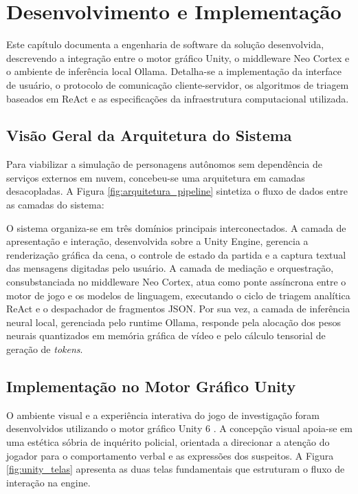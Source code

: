 \chapter{Desenvolvimento e Implementação}
\label{cap:implementacao}

Este capítulo documenta a engenharia de software da solução desenvolvida, descrevendo a integração entre o motor gráfico Unity, o middleware Neo Cortex e o ambiente de inferência local Ollama. Detalha-se a implementação da interface de usuário, o protocolo de comunicação cliente-servidor, os algoritmos de triagem baseados em ReAct e as especificações da infraestrutura computacional utilizada.

\section{Visão Geral da Arquitetura do Sistema}
\label{sec:dev_arquitetura}

Para viabilizar a simulação de personagens autônomos sem dependência de serviços externos em nuvem, concebeu-se uma arquitetura em camadas desacopladas. A Figura \ref{fig:arquitetura_pipeline} sintetiza o fluxo de dados entre as camadas do sistema:



O sistema organiza-se em três domínios principais interconectados. A camada de apresentação e interação, desenvolvida sobre a Unity Engine, gerencia a renderização gráfica da cena, o controle de estado da partida e a captura textual das mensagens digitadas pelo usuário. A camada de mediação e orquestração, consubstanciada no middleware Neo Cortex, atua como ponte assíncrona entre o motor de jogo e os modelos de linguagem, executando o ciclo de triagem analítica ReAct e o despachador de fragmentos JSON. Por sua vez, a camada de inferência neural local, gerenciada pelo runtime Ollama, responde pela alocação dos pesos neurais quantizados em memória gráfica de vídeo e pelo cálculo tensorial de geração de \textit{tokens}.

\section{Implementação no Motor Gráfico Unity}
\label{sec:dev_unity}

O ambiente visual e a experiência interativa do jogo de investigação foram desenvolvidos utilizando o motor gráfico Unity 6 \cite{unity2024engine}. A concepção visual apoia-se em uma estética sóbria de inquérito policial, orientada a direcionar a atenção do jogador para o comportamento verbal e as expressões dos suspeitos. A Figura \ref{fig:unity_telas} apresenta as duas telas fundamentais que estruturam o fluxo de interação na engine.

